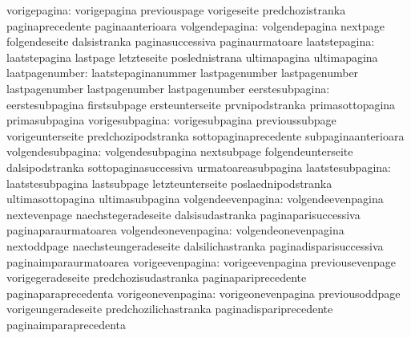              vorigepagina: vorigepagina              previouspage
                           vorigeseite               predchozistranka
                           paginaprecedente          paginaanterioara
           volgendepagina: volgendepagina            nextpage
                           folgendeseite             dalsistranka
                           paginasuccessiva          paginaurmatoare
            laatstepagina: laatstepagina             lastpage
                           letzteseite               poslednistrana
                           ultimapagina              ultimapagina
           laatpagenumber: laatstepaginanummer       lastpagenumber
                           lastpagenumber            lastpagenumber
                           lastpagenumber            lastpagenumber
          eerstesubpagina: eerstesubpagina           firstsubpage
                           ersteunterseite           prvnipodstranka
                           primasottopagina          primasubpagina
          vorigesubpagina: vorigesubpagina           previoussubpage
                           vorigeunterseite          predchozipodstranka
                           sottopaginaprecedente     subpaginaanterioara
        volgendesubpagina: volgendesubpagina         nextsubpage
                           folgendeunterseite        dalsipodstranka
                           sottopaginasuccessiva     urmatoareasubpagina
         laatstesubpagina: laatstesubpagina          lastsubpage
                           letzteunterseite          poslaednipodstranka
                           ultimasottopagina         ultimasubpagina
       volgendeevenpagina: volgendeevenpagina        nextevenpage
                           naechstegeradeseite       dalsisudastranka
                           paginaparisuccessiva      paginaparaurmatoarea
     volgendeonevenpagina: volgendeonevenpagina      nextoddpage
                           naechsteungeradeseite     dalsilichastranka
                           paginadisparisuccessiva   paginaimparaurmatoarea
         vorigeevenpagina: vorigeevenpagina          previousevenpage
                           vorigegeradeseite         predchozisudastranka
                           paginapariprecedente      paginaparaprecedenta
       vorigeonevenpagina: vorigeonevenpagina        previousoddpage
                           vorigeungeradeseite       predchozilichastranka
                           paginadispariprecedente   paginaimparaprecedenta

